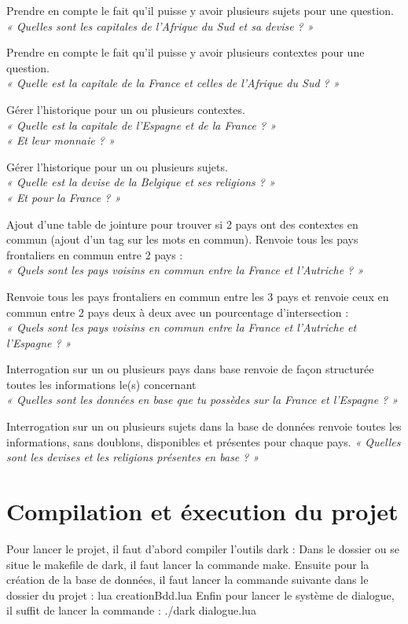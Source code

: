 \documentclass[11pt,a4paper]{article}
\begin{document}
Prendre en compte le fait qu’il puisse y avoir plusieurs sujets pour une question. \\
\textit{« Quelles sont les capitales de l’Afrique du Sud et sa devise ? »}

Prendre en compte le fait qu’il puisse y avoir plusieurs contextes pour une question. \\
\textit{« Quelle est la capitale de la France et celles de l’Afrique du Sud ? »}

Gérer l’historique pour un ou plusieurs contextes. \\
\textit{« Quelle est la capitale de l’Espagne et de la France ? »\\
	« Et leur monnaie ? »}

Gérer l’historique pour un ou plusieurs sujets. \\
\textit{« Quelle est la devise de la Belgique et ses religions ? » \\
	« Et pour la France ? »}

Ajout d’une table de jointure pour trouver si 2 pays ont des contextes en commun (ajout d’un tag sur les mots en commun). Renvoie tous les pays frontaliers en commun entre 2 pays : \\
\textit{« Quels sont les pays voisins en commun entre la France et l’Autriche ? »}

Renvoie tous les pays frontaliers en commun entre les 3 pays et renvoie ceux en commun entre 2 pays deux à deux avec un pourcentage d’intersection : \\
\textit{« Quels sont les pays voisins en commun entre la France et l’Autriche et l’Espagne ? »}

Interrogation sur un ou plusieurs pays dans base renvoie de façon structurée toutes les informations le(s) concernant \\
\textit{« Quelles sont les données en base que tu possèdes sur la France et l’Espagne ? »}

Interrogation sur un ou plusieurs sujets dans la base de données renvoie toutes les informations, sans doublons, disponibles et présentes pour chaque pays.
\textit{« Quelles sont les devises et les religions présentes en base ? »}


\section{Compilation et éxecution du projet}
Pour lancer le projet, il faut d'abord compiler l'outils dark :
Dans le dossier ou se situe le makefile de dark, il faut lancer la commande make.
Ensuite pour la création de la base de données, il faut lancer la commande suivante dans le dossier du projet :
lua creationBdd.lua
Enfin pour lancer le système de dialogue, il suffit de lancer la commande :
./dark dialogue.lua
\end{document}

